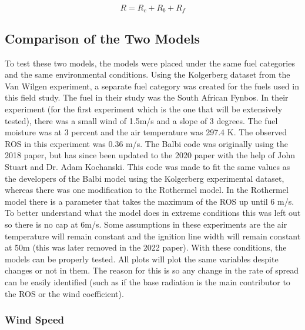 \documentclass{article}
\begin{document}
\begin{equation}
	R = R_c + R_b + R_f
	\label{Balbi ROS equation}
\end{equation}
\subsection{Comparison of the Two Models}
\indent To test these two models, the models were placed under the same fuel categories and the same environmental conditions. Using the Kolgerberg dataset from the Van Wilgen experiment, a separate fuel category was created for the fuels used in this field study. The fuel in their study was the South African Fynbos. In their experiment (for the first experiment which is the one that will be extensively tested), there was a small wind of 1.5m/s and a slope of 3 degrees. The fuel moisture was at 3 percent and the air temperature was 297.4 K. The observed ROS in this experiment was 0.36 m/s. The Balbi code was originally using the 2018 paper, but has since been updated to the 2020 paper with the help of John Stuart and Dr. Adam Kochanski. This code was made to fit the same values as the developers of the Balbi model using the Kolgerberg experimental dataset, whereas there was one modification to the Rothermel model. In the Rothermel model there is a parameter that takes the maximum of the ROS up until 6 m/s. To better understand what the model does in extreme conditions this was left out so there is no cap at 6m/s. Some assumptions in these experiments are the air temperature will remain constant and the ignition line width will remain constant at 50m (this was later removed in the 2022 paper). With these conditions, the models can be properly tested. All plots will plot the same variables despite changes or not in them. The reason for this is so any change in the rate of spread can be easily identified (such as if the base radiation is the main contributor to the ROS or the wind coefficient). 
\subsubsection{Wind Speed}
\end{document}
